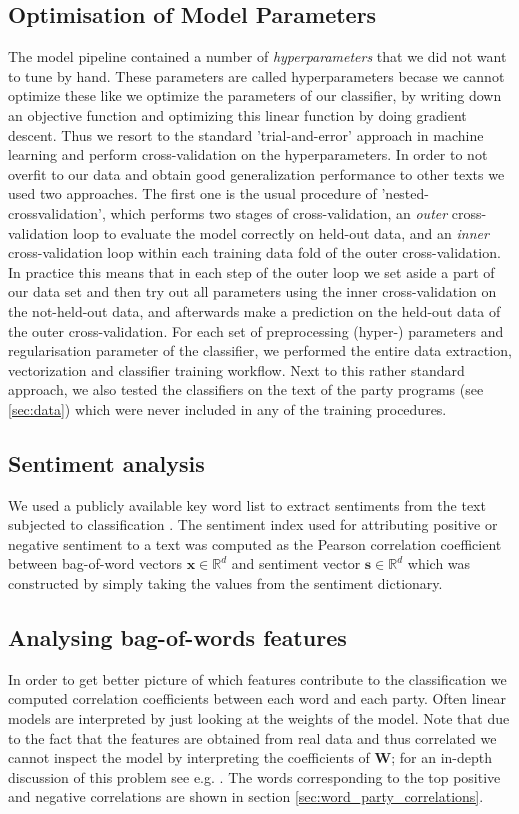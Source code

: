 \documentclass[runningheads,a4paper]{llncs}
\renewcommand{\vec}[1]{\mathbf{#1}}
\newcommand{\R}{\mathds{R}}
\begin{document}
\subsection{Optimisation of Model Parameters}\label{sec:crossvalidation}
The model pipeline contained a number of {\em hyperparameters} that we did not want to tune by hand. These parameters are called hyperparameters becase we cannot optimize these like we optimize the parameters of our classifier, by writing down an objective function and optimizing this linear function by doing gradient descent. Thus we resort to the standard 'trial-and-error' approach in machine learning and perform cross-validation on the hyperparameters. In order to not overfit to our data and obtain good generalization performance to other texts we used two approaches. The first one is the usual procedure of 'nested-crossvalidation', which performs two stages of cross-validation, an {\em outer} cross-validation loop to evaluate the model correctly on held-out data, and an {\em inner} cross-validation loop within each training data fold of the outer cross-validation. In practice this means that in each step of the outer loop we set aside a part of our data set and then try out all parameters using the inner cross-validation on the not-held-out data, and afterwards make a prediction on the held-out data of the outer cross-validation. For each set of preprocessing (hyper-) parameters and regularisation parameter of the classifier, we performed the entire data extraction, vectorization and classifier training workflow. Next to this rather standard approach, we also tested the classifiers on the text of the party programs (see \autoref{sec:data}) which were never included in any of the training procedures.

\subsection{Sentiment analysis}\label{sec:sentiment_analysis_methods}
We used a publicly available key word list to extract sentiments from the text subjected to classification \cite{remquahey2010}. The sentiment index used for attributing positive or negative sentiment to a text was computed  as the Pearson correlation coefficient between bag-of-word vectors $\vec{x}\in\R^d$ and sentiment vector $\vec{s}\in\R^d$ which was constructed by simply taking the values from the sentiment dictionary. 

\subsection{Analysing bag-of-words features}
In order to get  better picture of which features contribute to the classification we computed correlation coefficients between each word and each party. Often linear models are interpreted by just looking at the weights of the model. Note that due to the fact that the features are obtained from real data and thus correlated we cannot inspect the model by interpreting the coefficients of $\vec{W}$; for an in-depth discussion of this problem see e.g. \cite{Haufe2013}. The words corresponding to the top positive and negative correlations are shown in section \autoref{sec:word_party_correlations}.
\end{document}
